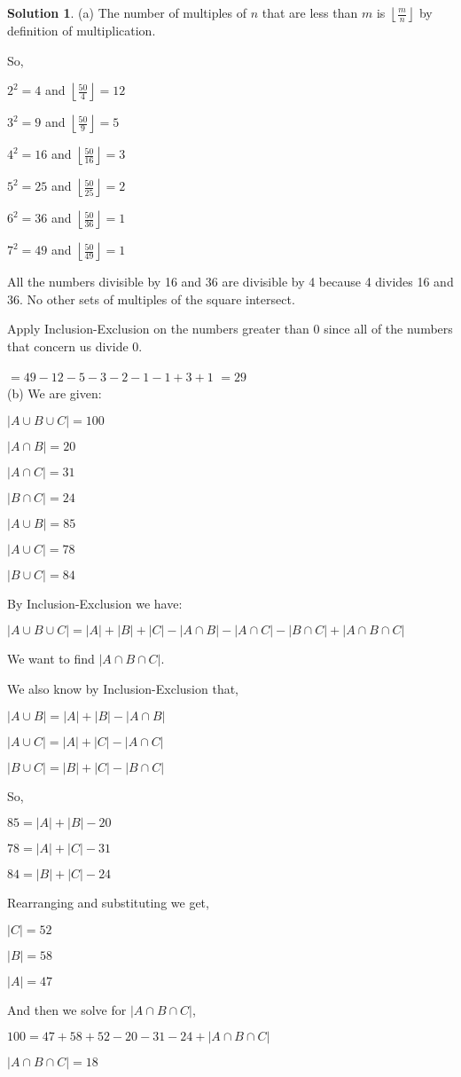 \documentclass{article}
\theoremstyle{definition}
\newtheorem*{solution}{Solution}
\begin{document}
\begin{solution}

(a) The number of multiples of \(n\) that are less than \(m\) is \(\left \lfloor{\frac{m}{n}}\right \rfloor \) by definition of multiplication.

So,

\(2^2=4\) and \(\left \lfloor{\frac{50}{4}}\right \rfloor =12\)

\(3^2=9\) and \(\left \lfloor{\frac{50}{9}}\right \rfloor =5\)

\(4^2=16\) and \(\left \lfloor{\frac{50}{16}}\right \rfloor =3\)

\(5^2=25\) and \(\left \lfloor{\frac{50}{25}}\right \rfloor =2\)

\(6^2=36\) and \(\left \lfloor{\frac{50}{36}}\right \rfloor =1\)

\(7^2=49\) and \(\left \lfloor{\frac{50}{49}}\right \rfloor =1\)

All the numbers divisible by 16 and 36 are divisible by 4 because 4 divides 16 and 36. No other sets of multiples of the square intersect.

Apply Inclusion-Exclusion on the numbers greater than 0 since all of the numbers that concern us divide 0.

\(=49-12-5-3-2-1-1+3+1\)
\(=29\) \\

(b) We are given:

\(|A\cup B\cup C|=100\)

\(|A\cap B|=20\)

\(|A\cap C|=31\)

\(|B\cap C|=24\)

\(|A\cup B|=85\)

\(|A\cup C|=78\)

\(|B\cup C|=84\)

By Inclusion-Exclusion we have:

\(|A\cup B\cup C|=|A|+|B|+|C|-|A\cap B|-|A\cap C|-|B\cap C| + |A\cap B\cap C|\)

We want to find \(|A\cap B\cap C|\).

We also know by Inclusion-Exclusion that,

\(|A\cup B|=|A|+|B|-|A\cap B|\)

\(|A\cup C|=|A|+|C|-|A\cap C|\)

\(|B\cup C|=|B|+|C|-|B\cap C|\)

So,

\(85=|A|+|B|-20\)

\(78=|A|+|C|-31\)

\(84=|B|+|C|-24\)

Rearranging and substituting we get,

\(|C|=52\)

\(|B|=58\)

\(|A|=47\)

And then we solve for \(|A\cap B\cap C|\),

\(100=47+58+52-20-31-24+|A\cap B\cap C|\)

\(|A\cap B\cap C|=18\)

\end{solution}
\end{document}
